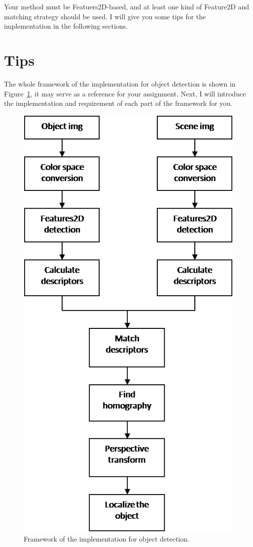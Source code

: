 \documentclass[12pt]{article}
\begin{document}
Your method must be Featuers2D-based, and at least one kind of Feature2D and matching strategy should be used. I will give you some tips for the implementation in the following sections.

\section{Tips}

The whole framework of the implementation for object detection is shown in Figure~\ref{fig: framework}, it may serve as a reference for your assignment. Next, I will introduce the implementation and requirement of each part of the framework for you.

\begin{figure}[!ht]
\centering
\includegraphics[height=0.6\textheight]{framework.png}
\caption{Framework of the implementation for object detection.}
\label{fig: framework}
\end{figure}
\end{document}
